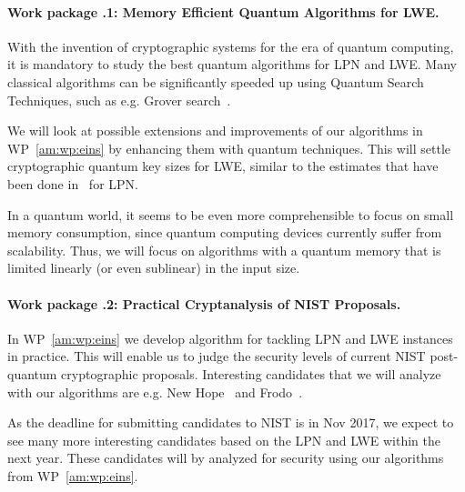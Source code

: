 \label{am:wp:zwei}


\paragraph{Work package \theworkpackage.1: Memory Efficient Quantum Algorithms for LWE.}

With the invention of cryptographic systems for the era of quantum computing, it is mandatory to study the best quantum algorithms for LPN and LWE. Many classical algorithms can be significantly speeded up using Quantum Search Techniques, such as e.g. Grover search~\cite{Grover96}.

We will look at possible extensions and improvements of our algorithms in WP~\ref{am:wp:eins} by enhancing them with quantum techniques. This will settle cryptographic quantum key sizes for LWE, similar to the estimates that have been done in~\cite{LPN} for LPN.

In a quantum world, it seems to be even more comprehensible to focus on small memory consumption, since quantum computing devices currently suffer from scalability. Thus, we will focus on algorithms with a quantum memory that is limited linearly (or even sublinear) in the input size.

\paragraph{Work package \theworkpackage.2: Practical Cryptanalysis of NIST Proposals.} In WP~\ref{am:wp:eins} we develop algorithm for tackling LPN and LWE instances in practice. This will enable us to judge the security levels of current NIST post-quantum cryptographic proposals. Interesting candidates that we will analyze with our algorithms are e.g. New Hope~\cite{ADPS16} and Frodo~\cite{BCDMNNRS16}. 

As the deadline for submitting candidates to NIST is in Nov 2017, we expect to see many more interesting candidates based on the LPN and LWE within the next year. These candidates will by analyzed for security using our algorithms from WP~\ref{am:wp:eins}.
